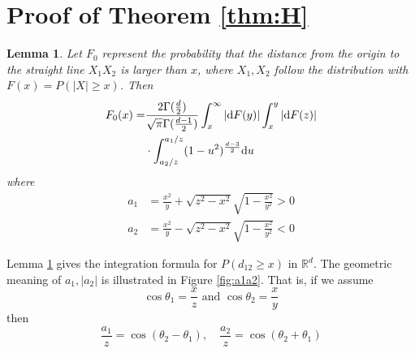 \documentclass[conference,a4paper]{IEEEtran}
\def\R{\mathbb{R}}
\def\d{\mathrm{d}}
\newtheorem{lemma}{Lemma}
\begin{document}
\section{Proof of Theorem \ref{thm:H}}\label{app:th}
\begin{lemma}\label{lem:F_0}
     Let $F_0$ represent the
probability that the distance from the origin to the straight line
$X_1X_2$ is larger than $x$, where $X_1, X_2$ follow the distribution with $F(x)=P(|X|\geq x)$.
Then 
\begin{align}\label{eq:F_0_expression}
     F_0(x)=&\frac{2\Gamma(\frac{d}{2})}
     {\sqrt{\pi}\Gamma(\frac{d-1}{2})}
     \int_x^{\infty} |\d F(y)|
     \int_x^{y} |\d F(z)| 
     \notag\\
     &\cdot \int_{a_2/z}^{a_1 /z} (1-u^2)^{\frac{d-3}{2}} \d u
 \end{align}
where
\begin{align}
     a_1 & =\frac{x^2}{y}+\sqrt{z^2-x^2}\sqrt{1-\frac{x^2}{y^2}} > 0
     \label{eq:a_1} \\
a_2 & =\frac{x^2}{y}-\sqrt{z^2-x^2}\sqrt{1-\frac{x^2}{y^2}} < 0
\label{eq:a_2}
\end{align}
\end{lemma}
Lemma \ref{lem:F_0} gives the integration formula for $P(d_{12}\geq x)$ in $\R^d$.
The geometric meaning of $a_1, |a_2|$ is illustrated in Figure
\ref{fig:a1a2}. That is, if we assume
\begin{equation}\label{eq:theta_1_theta_2}
     \cos\theta_1=\frac{x}{z}
     \textrm{ and } \cos\theta_2=\frac{x}{y} 
\end{equation}
then
\begin{equation}\label{eq:a_1_a_2}
     \frac{a_1}{z} = \cos(\theta_2 - \theta_1),
     \quad
     \frac{a_2}{z} = \cos(\theta_2+\theta_1)           
\end{equation}
\end{document}
